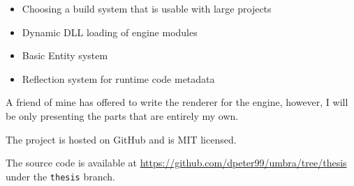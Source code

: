\begin{itemize}
    \item Choosing a build system that is usable with large projects
    \item Dynamic DLL loading of engine modules
    \item Basic Entity system
    \item Reflection system for runtime code metadata
\end{itemize}


A friend of mine has offered to write the renderer for the engine, however, I will be only presenting the parts that are entirely my own.

The project is hosted on GitHub and is MIT licensed.

The source code is available at \url{https://github.com/dpeter99/umbra/tree/thesis} under the \verb|thesis| branch.


\vfill
\selectthesislanguage

\setcounter{romanPage}{\value{page}}
